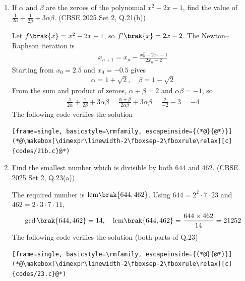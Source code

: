 \begin{enumerate}[label=\thesubsection.\arabic*, ref=\thesubsection.\theenumi]
\solution
By AA similarity, $\triangle DEF \sim \triangle QRP$ with $D \leftrightarrow Q$, $E \leftrightarrow R$, $F \leftrightarrow P$. Corresponding sides are proportional:
\begin{align}
	\frac{DE}{QR} = \frac{EF}{RP} = \frac{DF}{QP}
\end{align}
Options A, B and C compare corresponding sides. Option D compares $DE$ with $PQ$, which are not corresponding sides. Hence the proportion that is not true is Option D. The following code checks all four options on a pair of similar triangles
\begin{lstlisting}[frame=single, basicstyle=\rmfamily, escapeinside={(*@}{@*)}]
(*@\makebox[\dimexpr\linewidth-2\fboxsep-2\fboxrule\relax][c]{codes/18.c}@*)
\end{lstlisting}

\item
If $\alpha$ and $\beta$ are the zeroes of the polynomial $x^2 - 2x - 1$, find the value of $\frac{1}{2\alpha} + \frac{1}{2\beta} + 3\alpha\beta$.
\hfill (CBSE 2025 Set 2, Q.21(b))

\solution
Let $f\brak{x} = x^2 - 2x - 1$, so $f^{\prime}\brak{x} = 2x - 2$. The Newton--Raphson iteration is
\begin{align}
	x_{n+1} = x_n - \frac{x_n^2 - 2x_n - 1}{2x_n - 2}
\end{align}
Starting from $x_0 = 2.5$ and $x_0 = -0.5$ gives
\begin{align}
	\alpha = 1 + \sqrt{2}, \quad \beta = 1 - \sqrt{2}
\end{align}
From the sum and product of zeroes, $\alpha + \beta = 2$ and $\alpha\beta = -1$, so
\begin{align}
	\frac{1}{2\alpha} + \frac{1}{2\beta} + 3\alpha\beta = \frac{\alpha+\beta}{2\alpha\beta} + 3\alpha\beta = \frac{2}{-2} - 3 = -4
\end{align}
The following code verifies the solution
\begin{lstlisting}[frame=single, basicstyle=\rmfamily, escapeinside={(*@}{@*)}]
(*@\makebox[\dimexpr\linewidth-2\fboxsep-2\fboxrule\relax][c]{codes/21b.c}@*)
\end{lstlisting}

\item
Find the smallest number which is divisible by both $644$ and $462$.
\hfill (CBSE 2025 Set 2, Q.23(a))

\solution
The required number is $\text{lcm}\brak{644,462}$. Using $644 = 2^2\cdot 7\cdot 23$ and $462 = 2\cdot 3\cdot 7\cdot 11$,
\begin{align}
	\gcd\brak{644,462} = 14, \quad
	\text{lcm}\brak{644,462} = \frac{644 \times 462}{14} = 21252
\end{align}
The following code verifies the solution (both parts of Q.23)
\begin{lstlisting}[frame=single, basicstyle=\rmfamily, escapeinside={(*@}{@*)}]
(*@\makebox[\dimexpr\linewidth-2\fboxsep-2\fboxrule\relax][c]{codes/23.c}@*)
\end{lstlisting}


\end{enumerate}
